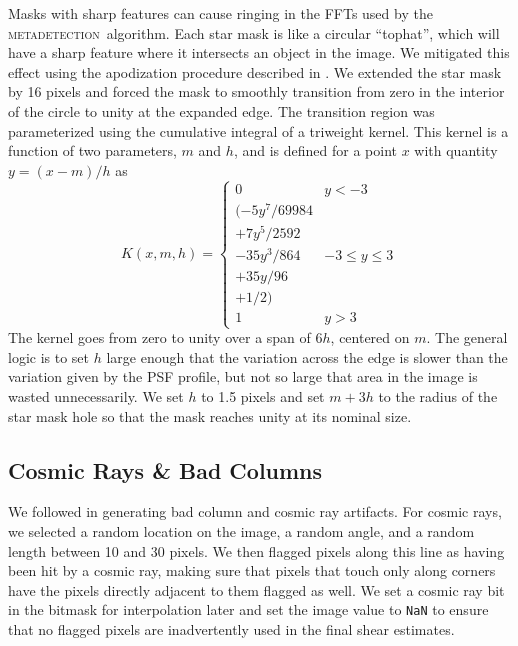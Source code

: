 \documentclass[twocolumn,twocolappendix,astrosym]{openjournal}
\newcommand{\mdet}{\textsc{metadetection}}
\begin{document}
Masks with sharp features can cause ringing in the FFTs used by the \mdet\
algorithm.   Each star mask is like a circular ``tophat'', which will have a
sharp feature where it intersects an object in the image.  We mitigated this
effect using the apodization procedure described in \citet{BeckerMdetCoadd}.
We extended the star mask by 16 pixels and forced the mask to smoothly
transition from zero in the interior of the circle to unity at the expanded
edge. The transition region was parameterized using the cumulative integral of
a triweight kernel. This kernel is a function of two parameters, $m$ and $h$,
and is defined for a point $x$ with quantity $y = (x-m)/h$ as
\begin{equation}
K(x, m, h) = \begin{cases}
0 & y < -3 \\
(-5y^7 / 69984 \\
+ 7y^5 / 2592 \\
- 35y^3 / 864 & -3 \le y \le 3 \\
+ 35y / 96 \\
+ 1 / 2) \\
1 & y > 3
\end{cases}
\end{equation}
The kernel goes from zero to unity over a span of $6h$, centered on $m$.
The general logic is to set $h$ large enough that the variation across the edge is
slower than the variation given by the PSF profile, but not so large that area
in the image is wasted unnecessarily. We set $h$ to 1.5 pixels and set $m+3h$ to
the radius of the star mask hole so that the mask reaches unity at its nominal size.

\subsection{Cosmic Rays \& Bad Columns} \label{sec:sim:cosmics_badcols}

We followed \citet{BeckerMdetCoadd} in generating bad column and
cosmic ray artifacts.  For cosmic rays, we selected a random location on the
image, a random angle, and a random length between 10 and 30 pixels. We then
flagged pixels along this line as having been hit by a cosmic ray, making sure
that pixels that touch only along corners have the pixels directly adjacent to
them flagged as well. We set a cosmic ray bit in the bitmask for interpolation
later and set the image value to \texttt{NaN} to ensure that no flagged pixels
are inadvertently used in the final shear estimates.
\end{document}
